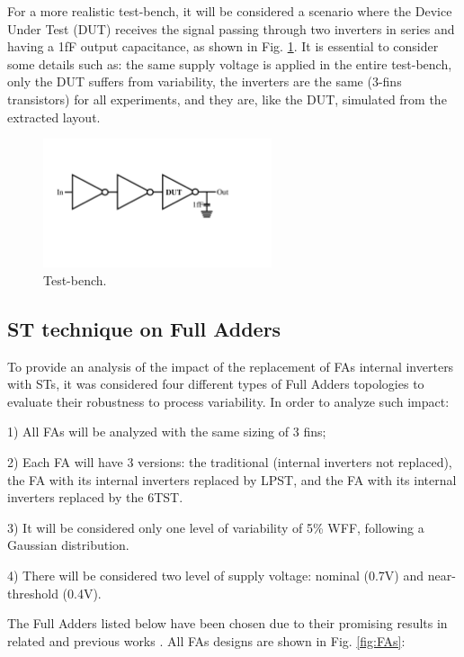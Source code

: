 \documentclass[diss,pgmicro,english]{iiufrgs}
\begin{document}
 For a more realistic test-bench, it will be considered a scenario where the Device Under Test (DUT) receives the signal passing through two inverters in series and having a 1fF output capacitance, as shown in Fig. \ref{fig:tbST}. It is essential to consider some details such as: the same supply voltage is applied in the entire test-bench, only the DUT suffers from variability, the inverters are the same (3-fins transistors) for all experiments, and they are, like the DUT, simulated from the extracted layout.

\begin{figure}[]
\centering
\includegraphics[width=0.6\textwidth, trim={2cm 7cm 6cm 5cm},clip]{testbench.pdf}
\caption{Test-bench.}
\label{fig:tbST}
\end{figure}

\subsection{ST technique on Full Adders}

To provide an analysis of the impact of the replacement of FAs internal inverters with STs, it was considered four different types of Full Adders topologies to evaluate their robustness to process variability. In order to analyze such impact:

1) All FAs will be analyzed with the same sizing of 3 fins;

2) Each FA will have 3 versions: the traditional (internal inverters not replaced), the FA with its internal inverters replaced by LPST, and the FA with its internal inverters replaced by the 6TST.

3) It will be considered only one level of variability of 5\% WFF, following a Gaussian distribution.

4) There will be considered two level of supply voltage: nominal (0.7V) and near-threshold (0.4V).

The Full Adders listed below have been chosen due to their promising results in related and previous works \cite{ames2016investigating,dokania2015circuit,dokania2013investigation,moraes2018evaluation}. All FAs designs are shown in Fig. \ref{fig:FAs}:
\end{document}
